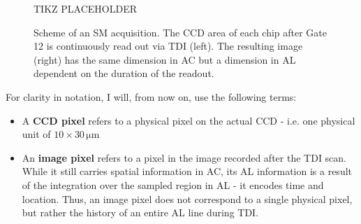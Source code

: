 \documentclass[a4paper, 11pt]{article}
\begin{document}
\begin{figure}[h]
  \centering
  {\Huge TIKZ PLACEHOLDER}
%
%        
%
%
%
%
%
%
%
  \caption{Scheme of an SM acquisition. The CCD area of each chip after Gate 12 is continuously read out via TDI (left). The resulting image (right) has the same dimension in AC but a dimension in AL dependent on the duration of the readout.}
  \label{fig:SM_Acq}
\end{figure}


For clarity in notation, I will, from now on, use the following terms:
\begin{itemize}
  \item A \textbf{CCD pixel} refers to a physical pixel on the actual CCD - i.e. one physical unit of $10 \times 30\, \mathrm{\mu m}$
  \item An \textbf{image pixel} refers to a pixel in the image recorded after the TDI scan. While it still carries spatial information in AC, its AL information is a result of the integration over the sampled region in AL - it encodes time and location. Thus, an image pixel does not correspond to a single physical pixel, but rather the history of an entire AL line during TDI.
\end{itemize}
\end{document}
